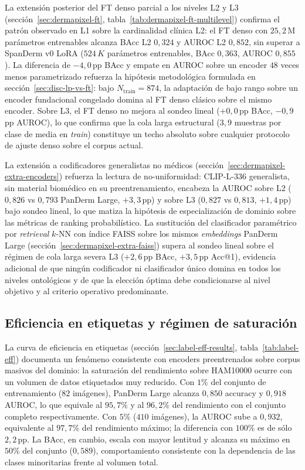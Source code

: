 La extensión posterior del FT denso parcial a los niveles L2 y L3
(secci\'on~\ref{sec:dermapixel-ft},
tabla~\ref{tab:dermapixel-ft-multilevel}) confirma el patrón
observado en L1 sobre la cardinalidad clínica L2: el FT denso con
$25{,}2$\,M parámetros entrenables alcanza BAcc L2 $0{,}324$ y
AUROC L2 $0{,}852$, sin superar a SpanDerm v0 LoRA ($524\,K$
parámetros entrenables, BAcc $0{,}363$, AUROC $0{,}855$). La
diferencia de $-4{,}0$\,pp BAcc y empate en AUROC sobre un
encoder $48$ veces menos parametrizado refuerza la hipótesis
metodológica formulada en secci\'on~\ref{sec:disc-lp-vs-ft}: bajo
$N_{\mathrm{train}} = 874$, la adaptación de bajo rango sobre un
encoder fundacional congelado domina al FT denso clásico sobre el
mismo encoder. Sobre L3, el FT denso no mejora al sondeo lineal
($+0{,}0$\,pp BAcc, $-0{,}9$\,pp AUROC), lo que confirma que la
cola larga estructural ($3{,}9$ muestras por clase de media en
\emph{train}) constituye un techo absoluto sobre cualquier
protocolo de ajuste denso sobre el corpus actual.

La extensión a codificadores generalistas no médicos
(secci\'on~\ref{sec:dermapixel-extra-encoders}) refuerza la lectura
de no-uniformidad: CLIP-L-336 generalista, sin material biomédico
en su preentrenamiento, encabeza la AUROC sobre L2
($0{,}826$ vs $0{,}793$ PanDerm Large, $+3{,}3$\,pp) y sobre L3
($0{,}827$ vs $0{,}813$, $+1{,}4$\,pp) bajo sondeo lineal, lo que
matiza la hipótesis de especialización de dominio sobre las
métricas de ranking probabilístico. La sustitución del clasificador
paramétrico por \emph{retrieval} $k$-NN con índice FAISS sobre los
mismos \emph{embeddings} PanDerm Large
(secci\'on~\ref{sec:dermapixel-extra-faiss}) supera al sondeo
lineal sobre el régimen de cola larga severa L3
($+2{,}6$\,pp BAcc, $+3{,}5$\,pp Acc@1), evidencia adicional
de que ningún codificador ni clasificador único domina en todos
los niveles ontológicos y de que la elección óptima debe
condicionarse al nivel objetivo y al criterio operativo
predominante.

\subsection{Eficiencia en etiquetas y régimen de saturación}
\label{sec:disc-eficiencia}

La curva de eficiencia en etiquetas
(secci\'on~\ref{sec:label-eff-results}, tabla~\ref{tab:label-eff})
documenta un fenómeno consistente con encoders preentrenados sobre
corpus masivos del dominio: la saturación del rendimiento sobre
HAM10000 ocurre con un volumen de datos etiquetados muy reducido.
Con $1\%$ del conjunto de entrenamiento ($82$ imágenes),
PanDerm Large alcanza $0{,}850$ accuracy y $0{,}918$ AUROC, lo
que equivale al $95{,}7\%$ y al $96{,}2\%$ del rendimiento
con el conjunto completo respectivamente. Con $5\%$
($410$ imágenes), la AUROC sube a $0{,}932$, equivalente al
$97{,}7\%$ del rendimiento máximo; la diferencia con
$100\%$ es de sólo $2{,}2$\,pp. La BAcc, en cambio, escala
con mayor lentitud y alcanza su máximo en $50\%$ del conjunto
($0{,}589$), comportamiento consistente con la dependencia de las
clases minoritarias frente al volumen total.


